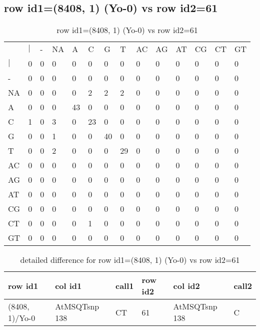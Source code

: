 \subsection{row id1=(8408, 1) (Yo-0) vs row id2=61}
\begin{center}
\begin{longtable}{|l|l|l|l|l|l|l|l|l|l|l|l|l|l|}
\caption{row id1=(8408, 1) (Yo-0) vs row id2=61} \label{table_dm476}\\
\hline
\\
\hline
&$|$&-&NA&A&C&G&T&AC&AG&AT&CG&CT&GT\\
$|$&0&0&0&0&0&0&0&0&0&0&0&0&0\\
-&0&0&0&0&0&0&0&0&0&0&0&0&0\\
NA&0&0&0&0&2&2&2&0&0&0&0&0&0\\
A&0&0&0&43&0&0&0&0&0&0&0&0&0\\
C&1&0&3&0&23&0&0&0&0&0&0&0&0\\
G&0&0&1&0&0&40&0&0&0&0&0&0&0\\
T&0&0&2&0&0&0&29&0&0&0&0&0&0\\
AC&0&0&0&0&0&0&0&0&0&0&0&0&0\\
AG&0&0&0&0&0&0&0&0&0&0&0&0&0\\
AT&0&0&0&0&0&0&0&0&0&0&0&0&0\\
CG&0&0&0&0&0&0&0&0&0&0&0&0&0\\
CT&0&0&0&0&1&0&0&0&0&0&0&0&0\\
GT&0&0&0&0&0&0&0&0&0&0&0&0&0\\
\hline
\end{longtable}
\end{center}

\begin{center}
\begin{longtable}{|l|l|l|l|l|l|}
\caption{detailed difference for row id1=(8408, 1) (Yo-0) vs row id2=61} \label{table_dm477}\\
\hline
row id1&col id1&call1&row id2&col id2&call2\\
\hline
(8408, 1)/Yo-0&AtMSQTsnp 138&CT&61&AtMSQTsnp 138&C\\
\hline
\end{longtable}
\end{center}

